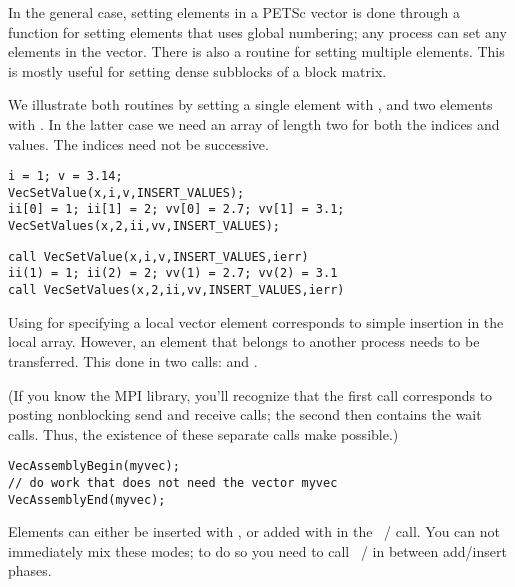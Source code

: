 In the general case, setting elements in a PETSc vector is done
through a
function  for setting elements that uses global numbering; any
process can set any elements in the vector.
%
There is also a routine  for setting
multiple elements. This is mostly useful for setting dense subblocks
of a block matrix.

We illustrate both routines by setting a single element with ,
and two elements with . In the latter case
we need an array of length two for both the indices and values. The indices need
not be successive.

\lstset{language=C}
\begin{lstlisting}
i = 1; v = 3.14;
VecSetValue(x,i,v,INSERT_VALUES);
ii[0] = 1; ii[1] = 2; vv[0] = 2.7; vv[1] = 3.1;
VecSetValues(x,2,ii,vv,INSERT_VALUES);
\end{lstlisting}

\lstset{language=Fortran}
\begin{lstlisting}
call VecSetValue(x,i,v,INSERT_VALUES,ierr)
ii(1) = 1; ii(2) = 2; vv(1) = 2.7; vv(2) = 3.1
call VecSetValues(x,2,ii,vv,INSERT_VALUES,ierr)
\end{lstlisting}
\lstset{language=C}

Using  for specifying a local vector element
corresponds to simple insertion in the local array. However,
an element that belongs to another process needs to be
transferred. This done in two calls: 
and .


(If you know the MPI library, you'll recognize that the first call corresponds to
posting nonblocking send and receive calls; the second then contains
the wait calls. Thus, the existence of these separate calls make
 possible.)

\begin{lstlisting}
VecAssemblyBegin(myvec);
// do work that does not need the vector myvec
VecAssemblyEnd(myvec);
\end{lstlisting}

Elements can either be inserted
with ,
or added with  in the
~/  call.
You can not immediately mix these modes; to do so you need to call
~/ 
in between add/insert phases.

